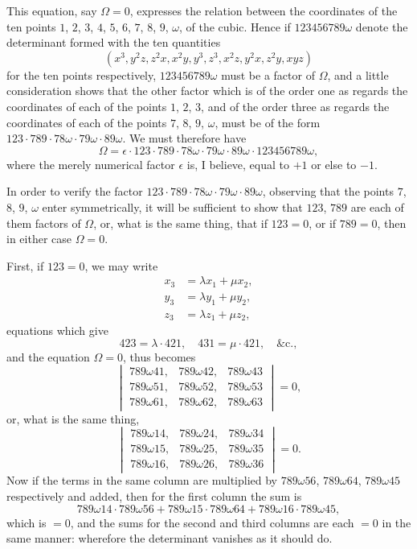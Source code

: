 \documentclass[11pt,a4paper]{book}
\begin{document}
\newpage
\setcounter{page}{503}

This equation, say $\Omega = 0$, expresses the relation between the coordinates of the ten points $1$, $2$, $3$, $4$, $5$, $6$, $7$, $8$, $9$, $\omega$, of the cubic. Hence if $123456789\omega$ denote the determinant formed with the ten quantities
\[
(x^3, y^2z, z^2x, x^2y, y^3, z^3, x^2z, y^2x, z^2y, xyz)
\]
for the ten points respectively, $123456789\omega$ must be a factor of $\Omega$, and a little consideration shows that the other factor which is of the order one as regards the coordinates of each of the points $1$, $2$, $3$, and of the order three as regards the coordinates of each of the points $7$, $8$, $9$, $\omega$, must be of the form $123 \cdot 789 \cdot 78\omega \cdot 79\omega \cdot 89\omega$. We must therefore have
\[
\Omega = \epsilon \cdot 123 \cdot 789 \cdot 78\omega \cdot 79\omega \cdot 89\omega \cdot 123456789\omega,
\]
where the merely numerical factor $\epsilon$ is, I believe, equal to $+1$ or else to $-1$.

In order to verify the factor $123 \cdot 789 \cdot 78\omega \cdot 79\omega \cdot 89\omega$, observing that the points $7$, $8$, $9$, $\omega$ enter symmetrically, it will be sufficient to show that $123$, $789$ are each of them factors of $\Omega$, or, what is the same thing, that if $123 = 0$, or if $789 = 0$, then in either case $\Omega = 0$.

First, if $123 = 0$, we may write
\begin{align*}
x_3 &= \lambda x_1 + \mu x_2,\\
y_3 &= \lambda y_1 + \mu y_2,\\
z_3 &= \lambda z_1 + \mu z_2,
\end{align*}
equations which give
\[
423 = \lambda \cdot 421,\quad 431 = \mu \cdot 421,\quad \&\mathrm{c.},
\]
and the equation $\Omega = 0$, thus becomes
\[
\begin{vmatrix}
789\omega 41, & 789\omega 42, & 789\omega 43\\
789\omega 51, & 789\omega 52, & 789\omega 53\\
789\omega 61, & 789\omega 62, & 789\omega 63
\end{vmatrix}
= 0,
\]
or, what is the same thing,
\[
\begin{vmatrix}
789\omega 14, & 789\omega 24, & 789\omega 34\\
789\omega 15, & 789\omega 25, & 789\omega 35\\
789\omega 16, & 789\omega 26, & 789\omega 36
\end{vmatrix}
= 0.
\]
Now if the terms in the same column are multiplied by $789\omega 56$, $789\omega 64$, $789\omega 45$ respectively and added, then for the first column the sum is
\[
789\omega 14 \cdot 789\omega 56 + 789\omega 15 \cdot 789\omega 64 + 789\omega 16 \cdot 789\omega 45,
\]
which is $= 0$, and the sums for the second and third columns are each $= 0$ in the same manner: wherefore the determinant vanishes as it should do.
\end{document}
